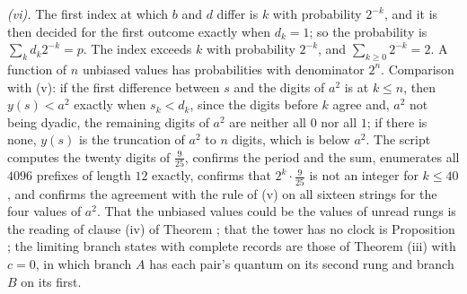 \emph{(vi).} The first index at which $b$ and $d$ differ is $k$ with probability $2^{-k}$, and it is then decided for the first outcome exactly when $d_{k} = 1$; so the probability is $\sum_{k}d_{k}2^{-k} = p$. The index exceeds $k$ with probability $2^{-k}$, and $\sum_{k \ge 0}2^{-k} = 2$. A function of $n$ unbiased values has probabilities with denominator $2^{n}$. Comparison with (v): if the first difference between $s$ and the digits of $a^{2}$ is at $k \le n$, then $y(s) < a^{2}$ exactly when $s_{k} < d_{k}$, since the digits before $k$ agree and, $a^{2}$ not being dyadic, the remaining digits of $a^{2}$ are neither all $0$ nor all $1$; if there is none, $y(s)$ is the truncation of $a^{2}$ to $n$ digits, which is below $a^{2}$. The script computes the twenty digits of $\tfrac{9}{25}$, confirms the period and the sum, enumerates all $4096$ prefixes of length $12$ exactly, confirms that $2^{k}\cdot\tfrac{9}{25}$ is not an integer for $k \le 40$, and confirms the agreement with the rule of (v) on all sixteen strings for the four values of $a^{2}$. That the unbiased values could be the values of unread rungs is the reading of clause (iv) of Theorem ; that the tower has no clock is Proposition ; the limiting branch states with complete records are those of Theorem (iii) with $c = 0$, in which branch $A$ has each pair's quantum on its second rung and branch $B$ on its first.
